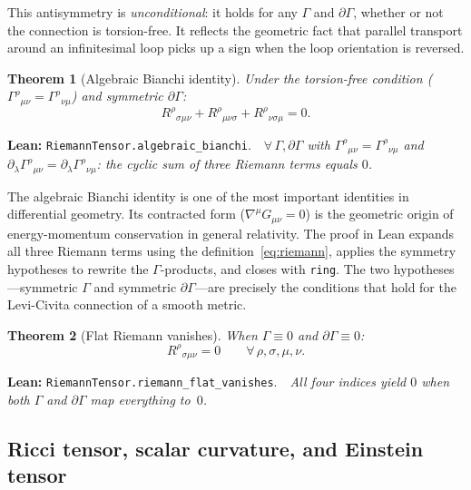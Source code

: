 \documentclass[11pt,a4paper]{article}
\newtheorem{theorem}{Theorem}[section]
\newcommand{\lean}[1]{\texttt{#1}}
\newcommand{\leanref}[2]{\noindent\textbf{Lean:} \lean{#1}.\ \ \textit{#2}}
\begin{document}
\noindent This antisymmetry is \emph{unconditional}: it holds for any $\Gamma$ and $\partial\Gamma$, whether or not the connection is torsion-free.
It reflects the geometric fact that parallel transport around an infinitesimal loop picks up a sign when the loop orientation is reversed.

\begin{theorem}[Algebraic Bianchi identity]
\label{thm:bianchi}
Under the torsion-free condition ($\Gamma^\rho{}_{\mu\nu} = \Gamma^\rho{}_{\nu\mu}$) and symmetric $\partial\Gamma$:
\begin{equation}\label{eq:bianchi}
R^\rho{}_{\sigma\mu\nu} + R^\rho{}_{\mu\nu\sigma} + R^\rho{}_{\nu\sigma\mu} = 0.
\end{equation}
\end{theorem}

\leanref{RiemannTensor.algebraic\_bianchi}{$\forall\,\Gamma,\partial\Gamma$ with $\Gamma^\rho{}_{\mu\nu} = \Gamma^\rho{}_{\nu\mu}$ and $\partial_\lambda\Gamma^\rho{}_{\mu\nu} = \partial_\lambda\Gamma^\rho{}_{\nu\mu}$: the cyclic sum of three Riemann terms equals $0$.}

\noindent The algebraic Bianchi identity is one of the most important identities in differential geometry.
Its contracted form ($\nabla^\mu G_{\mu\nu} = 0$) is the geometric origin of energy-momentum conservation in general relativity.
The proof in Lean expands all three Riemann terms using the definition~\eqref{eq:riemann}, applies the symmetry hypotheses to rewrite the $\Gamma$-products, and closes with \texttt{ring}.
The two hypotheses---symmetric $\Gamma$ and symmetric $\partial\Gamma$---are precisely the conditions that hold for the Levi-Civita connection of a smooth metric.

\begin{theorem}[Flat Riemann vanishes]
\label{thm:flat_riemann}
When $\Gamma \equiv 0$ and $\partial\Gamma \equiv 0$:
\begin{equation}\label{eq:flat_riemann}
R^\rho{}_{\sigma\mu\nu} = 0 \qquad \forall\,\rho,\sigma,\mu,\nu.
\end{equation}
\end{theorem}

\leanref{RiemannTensor.riemann\_flat\_vanishes}{All four indices yield $0$ when both $\Gamma$ and $\partial\Gamma$ map everything to~$0$.}

\subsection{Ricci tensor, scalar curvature, and Einstein tensor}
\end{document}
